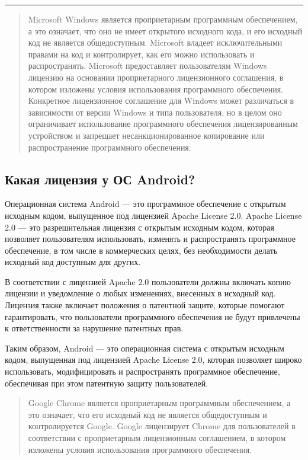 \documentclass[letterpaper,10pt,russian]{sphinxmanual}
\begin{document}
\bigskip\hrule\bigskip

\begin{quote}

\sphinxAtStartPar
Microsoft Windows является проприетарным программным обеспечением, а это означает, что оно не имеет открытого исходного кода, и его исходный код не является общедоступным. Microsoft владеет исключительными правами на код и контролирует, как его можно использовать и распространять. Microsoft предоставляет пользователям Windows лицензию на основании проприетарного лицензионного соглашения, в котором изложены условия использования программного обеспечения. Конкретное лицензионное соглашение для Windows может различаться в зависимости от версии Windows и типа пользователя, но в целом оно ограничивает использование программного обеспечения лицензированным устройством и запрещает несанкционированное копирование или распространение программного обеспечения.
\end{quote}


\subsection{Какая лицензия у ОС Android?}
\label{\detokenize{educational_materials/open_license/content:android}}
\sphinxAtStartPar
Операционная система Android — это программное обеспечение с открытым исходным кодом, выпущенное под лицензией Apache License 2.0. Apache License 2.0 — это разрешительная лицензия с открытым исходным кодом, которая позволяет пользователям использовать, изменять и распространять программное обеспечение, в том числе в коммерческих целях, без необходимости делать исходный код доступным для других.

\sphinxAtStartPar
В соответствии с лицензией Apache 2.0 пользователи должны включать копию лицензии и уведомление о любых изменениях, внесенных в исходный код. Лицензия также включает положения о патентной защите, которые помогают гарантировать, что пользователи программного обеспечения не будут привлечены к ответственности за нарушение патентных прав.

\sphinxAtStartPar
Таким образом, Android — это операционная система с открытым исходным кодом, выпущенная под лицензией Apache License 2.0, которая позволяет широко использовать, модифицировать и распространять программное обеспечение, обеспечивая при этом патентную защиту пользователей.
\begin{quote}

\sphinxAtStartPar
Google Chrome является проприетарным программным обеспечением, а это означает, что его исходный код не является общедоступным и контролируется Google. Google лицензирует Chrome для пользователей в соответствии с проприетарным лицензионным соглашением, в котором изложены условия использования программного обеспечения.
\end{quote}
\end{document}
